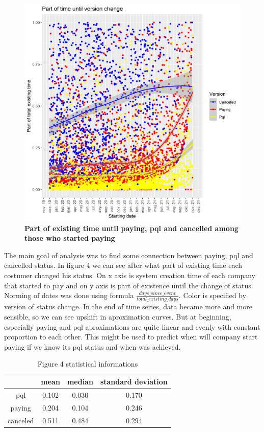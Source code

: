 \documentclass[fleqn,moreauthors,10pt]{ds_report}
\begin{document}
\begin{figure}\centering
	\includegraphics[width=\linewidth]{activity_after_days.png}
	\caption{\textbf{Part of existing time until paying, pql and cancelled among those who started paying} }
	\label{fig:main}
\end{figure}
The main goal of analysis was to find some connection between paying, pql and cancelled status. In figure 4 we can see after what part of existing time each costumer changed his status. On x axis is system creation time of each company that started to pay and on y axis is part of existence until the change of status. Norming of dates was done using formula $\frac{days\_since\_event}{total\_existing\_days}$. Color is specified by version of status change. In the end of time series, data became more and more sensible, so we can see upshift in aproximation curves. But at beginning, especially paying and pql aproximations are quite linear and evenly with constant proportion to each other. This might be used to predict when will company start paying if we know its pql status and when was achieved. 
\begin{center}

\begin{table}
\caption{Figure 4 statistical informations}

\begin{tabular}{|c |c c c||} 
 \hline
  & mean & median & standard deviation \\ [0.5ex] 
 \hline\hline
 pql & 0.102 &  0.030 & 0.170 \\ 
 \hline
 paying & 0.204 & 0.104 & 0.246 \\
 \hline
 canceled & 0.511 & 0.484 & 0.294 \\
 \hline
 
\end{tabular}

\end{table}

\end{center}
\end{document}
